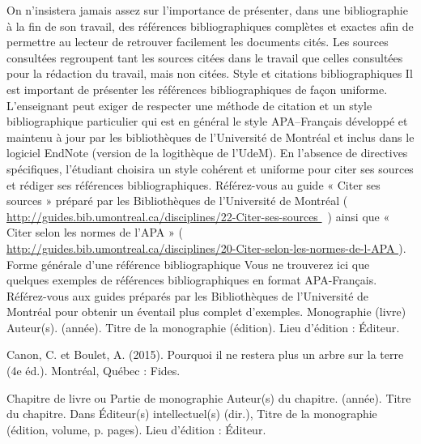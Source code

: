 \documentclass [12 pt]{article}
\begin{document}
            On n'insistera jamais assez sur l'importance de présenter, dans une bibliographie à
                la fin de son travail, des références bibliographiques complètes et exactes afin de
                permettre au lecteur de retrouver facilement les documents cités. Les sources
                consultées regroupent tant les sources citées dans le travail que celles consultées
                pour la rédaction du travail, mais non citées.
            Style et citations bibliographiques
            Il est important de présenter les références bibliographiques de façon uniforme.
                L'enseignant peut exiger de respecter une méthode de citation et un style
                bibliographique particulier qui est en général le style APA–Français développé et
                maintenu à jour par les bibliothèques de l'Université de Montréal et inclus dans le
                logiciel EndNote (version de la logithèque de l'UdeM). En l'absence de directives
                spécifiques, l'étudiant choisira un style cohérent et uniforme pour citer ses
                sources et rédiger ses références bibliographiques. Référez-vous au guide « Citer
                ses sources » préparé par les Bibliothèques de l'Université de Montréal
                    (
        \href{
        http://guides.bib.umontreal.ca/disciplines/22-Citer-ses-sources
        } {
        http://guides.bib.umontreal.ca/disciplines/22-Citer-ses-sources
        }
     )
                ainsi que « Citer selon les normes de l'APA » (
        \href{
        http://guides.bib.umontreal.ca/disciplines/20-Citer-selon-les-normes-de-l-APA
        } {
        http://guides.bib.umontreal.ca/disciplines/20-Citer-selon-les-normes-de-l-APA
        }
    ).
            Forme générale d'une référence bibliographique
            Vous ne trouverez ici que quelques exemples de références bibliographiques en format
                APA-Français. Référez-vous aux guides préparés par les Bibliothèques de l'Université
                de Montréal pour obtenir un éventail plus complet d'exemples.
            Monographie
                (livre)
            {Auteur(s)}. ({année}). {Titre de la monographie} ({édition}). {Lieu
                d'édition} : {Éditeur}.
            
                Canon, C. et Boulet, A. (2015). Pourquoi il ne restera plus un arbre sur la
                        terre (4e éd.). Montréal, Québec : Fides.
            
            Chapitre de livre ou Partie de monographie
            {Auteur(s) du chapitre}. ({année}). {Titre du chapitre}. Dans {Éditeur(s)
                intellectuel(s)} (dir.), {Titre de la monographie} ({édition}, {volume}, p.
                {pages}). {Lieu d'édition} : {Éditeur}.
            
\end{document}
